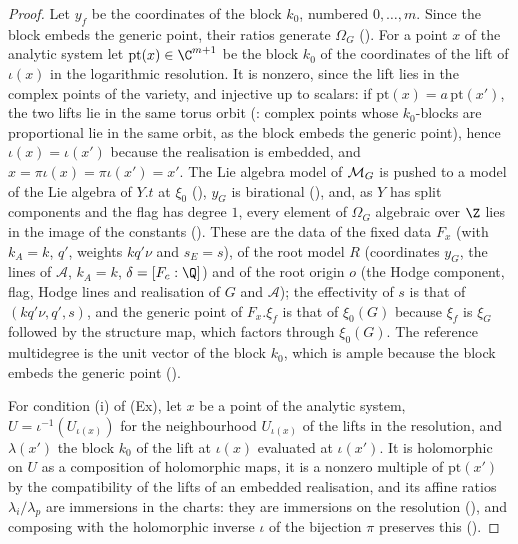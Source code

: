 \begin{proof}
Let $y_f$ be the coordinates of the block $k_0$, numbered $0,\dots,m$. Since the block embeds the generic point,
their ratios generate $\Omega_G$ ().
For a point $x$ of the analytic system let $\mathrm{pt}(x)\in\C^{m+1}$ be the block $k_0$ of the coordinates of the
lift of $\iota(x)$ in the logarithmic resolution. It is nonzero, since the lift lies in the complex points of the
variety, and injective up to scalars: if $\mathrm{pt}(x)=a\,\mathrm{pt}(x')$, the two lifts lie in the same torus
orbit (: complex points whose $k_0$-blocks are
proportional lie in the same orbit, as the block embeds the generic point), hence $\iota(x)=\iota(x')$ because the
realisation is embedded, and $x=\pi\iota(x)=\pi\iota(x')=x'$. The Lie algebra model of $\mathcal M_G$ is pushed to
a model of the Lie algebra of $Y.t$ at $\xi_0$ (), $y_G$ is
birational (), and, as $Y$ has split components and the flag
has degree $1$, every element of $\Omega_G$ algebraic over $\Z$ lies in the image of the constants
(). These are the data of the fixed data $F_x$ (with
$k_A=k$, $q'$, weights $kq'\nu$ and $s_E=s$), of the root model $R$ (coordinates $y_G$, the lines of $\mathcal A$,
$k_A=k$, $\delta=[F_c:\Q]$) and of the root origin $o$ (the Hodge component, flag, Hodge lines and realisation of
$G$ and $\mathcal A$); the effectivity of $s$ is that of $(kq'\nu,q',s)$, and the generic point of $F_x.\xi_f$ is
that of $\xi_0(G)$ because $\xi_f$ is $\xi_G$ followed by the structure map, which factors through $\xi_0(G)$.
The reference multidegree is the unit vector of the block $k_0$, which is ample because the block embeds the
generic point ().

For condition (i) of (Ex), let $x$ be a point of the analytic system, $U=\iota^{-1}(U_{\iota(x)})$ for the
neighbourhood $U_{\iota(x)}$ of the lifts in the resolution, and $\lambda(x')$ the block $k_0$ of the lift at
$\iota(x)$ evaluated at $\iota(x')$. It is holomorphic on $U$ as a composition of holomorphic maps, it is a nonzero
multiple of $\mathrm{pt}(x')$ by the compatibility of the lifts of an embedded realisation, and its affine ratios
$\lambda_i/\lambda_p$ are immersions in the charts: they are immersions on the resolution
(), and composing with the holomorphic inverse $\iota$ of
the bijection $\pi$ preserves this ().
\end{proof}

